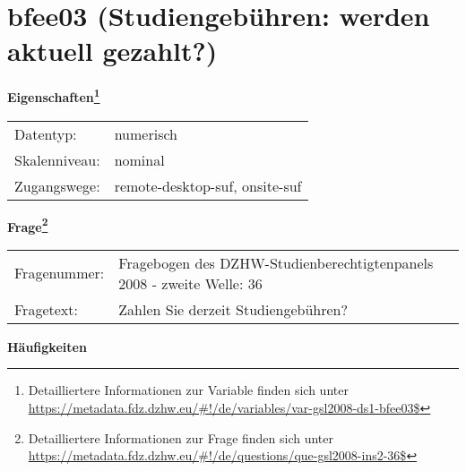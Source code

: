
    \setcounter{footnote}{0}

    \vspace*{-1.8cm}
	\section{bfee03 (Studiengebühren: werden aktuell gezahlt?)}
	\label{section:bfee03}



    \vspace*{0.5cm}
    \noindent\textbf{Eigenschaften\footnote{Detailliertere Informationen zur Variable finden sich unter
		\url{https://metadata.fdz.dzhw.eu/\#!/de/variables/var-gsl2008-ds1-bfee03$}}}\\
	\begin{tabularx}{\hsize}{@{}lX}
	Datentyp: & numerisch \\
	Skalenniveau: & nominal \\
	Zugangswege: &
	  remote-desktop-suf, 
	  onsite-suf
 \\
    \end{tabularx}



				\vspace*{0.5cm}
                \noindent\textbf{Frage\footnote{Detailliertere Informationen zur Frage finden sich unter
		              \url{https://metadata.fdz.dzhw.eu/\#!/de/questions/que-gsl2008-ins2-36$}}}\\
				\begin{tabularx}{\hsize}{@{}lX}
					Fragenummer: &
					  Fragebogen des DZHW-Studienberechtigtenpanels 2008 - zweite Welle:
					  36
 \\
					Fragetext: & Zahlen Sie derzeit Studiengebühren? \\
				\end{tabularx}





        		\vspace*{0.5cm}
                \noindent\textbf{Häufigkeiten}

